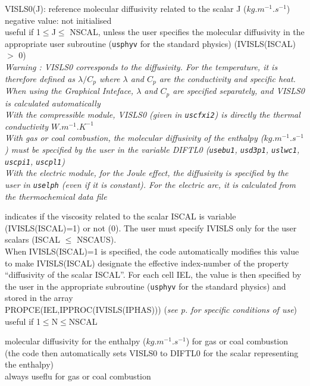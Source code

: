 {VISLS0(J): reference molecular diffusivity related to the scalar J
($kg.m^{-1}.s^{-1}$)\\
negative value: not initialised\\
useful if 1$\leqslant$J$\leqslant$ NSCAL, unless the user specifies the
molecular diffusivity in the appropriate user subroutine (\texttt{usphyv} for
the standard physics) (IVISLS(ISCAL) $>$ 0)\\
{\em Warning : VISLS0 corresponds to the diffusivity. For the temperature, it is
therefore defined as $\lambda/C_p$ where $\lambda$ and $C_p$ are the
conductivity and specific heat. When using the Graphical Inteface, $\lambda$ and
$C_p$ are specified separately, and VISLS0 is calculated automatically\\
With the compressible module, VISLS0 (given in \texttt{uscfxi2}) is directly the
thermal conductivity $W.m^{-1}.K^{-1}$\\
With gas or coal combustion, the molecular diffusivity of the enthalpy
($kg.m^{-1}.s^{-1}$) must be specified by the user in the variable DIFTL0 (\texttt{usebu1},
\texttt{usd3p1}, \texttt{uslwc1}, \texttt{uscpi1}, \texttt{uscpl1})\\
With the electric module, for the Joule effect, the diffusivity is specified by
the user in \texttt{uselph} (even if it is constant). For the electric arc, it
is calculated from the thermochemical data file}}

{indicates if the viscosity related to the scalar ISCAL is variable
(IVISLS(ISCAL)=1) or not (0). The user must specify IVISLS only for the
user scalars (ISCAL $\leqslant$ NSCAUS).\\
When IVISLS(ISCAL)=1 is specified, the code automatically modifies this value to
make IVISLS(ISCAL) designate the effective index-number of the property
``diffusivity of the scalar ISCAL''. For each cell IEL, the value
is then specified by the user in the appropriate subroutine
(\texttt{usphyv} for the standard physics) and stored in the array\\
PROPCE(IEL,IPPROC(IVISLS(IPHAS)))
({\em see p.\pageref{prg_propvar} for specific conditions of use})\\
useful if 1$\leqslant$N$\leqslant$NSCAL}


{molecular diffusivity for the enthalpy ($kg.m^{-1}.s^{-1}$) for gas or coal
combustion (the code then automatically sets VISLS0 to DIFTL0 for the scalar
representing the enthalpy)\\
always useflu for gas or coal combustion}

